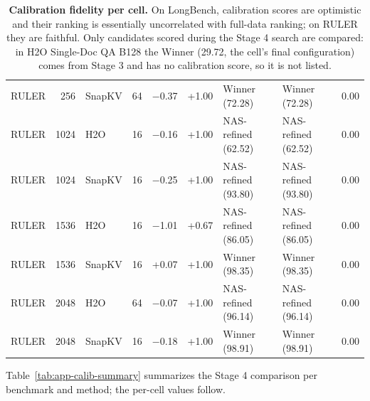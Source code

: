 \begin{table}[t]
\begin{tabular}{@{}l r l r r r l l r@{}}
    RULER & 256 & SnapKV & 64 & $-$0.37 & +1.00 & Winner (72.28) & Winner (72.28) & 0.00 \\
    RULER & 1024 & H2O & 16 & $-$0.16 & +1.00 & NAS-refined (62.52) & NAS-refined (62.52) & 0.00 \\
    RULER & 1024 & SnapKV & 16 & $-$0.25 & +1.00 & NAS-refined (93.80) & NAS-refined (93.80) & 0.00 \\
    RULER & 1536 & H2O & 16 & $-$1.01 & +0.67 & NAS-refined (86.05) & NAS-refined (86.05) & 0.00 \\
    RULER & 1536 & SnapKV & 16 & +0.07 & +1.00 & Winner (98.35) & Winner (98.35) & 0.00 \\
    RULER & 2048 & H2O & 64 & $-$0.07 & +1.00 & NAS-refined (96.14) & NAS-refined (96.14) & 0.00 \\
    RULER & 2048 & SnapKV & 16 & $-$0.18 & +1.00 & Winner (98.91) & Winner (98.91) & 0.00 \\
    \bottomrule
  \end{tabular}
  \caption{\textbf{Calibration fidelity per cell.} On LongBench, calibration scores are optimistic and their ranking is essentially uncorrelated with full-data ranking; on RULER they are faithful. Only candidates scored during the Stage 4 search are compared: in H2O Single-Doc QA B128 the Winner (29.72, the cell's final configuration) comes from Stage 3 and has no calibration score, so it is not listed.}
  \label{tab:app-calib}
\end{table}


Table~\ref{tab:app-calib-summary} summarizes the Stage 4 comparison per benchmark and method; the per-cell values follow.

\begin{table}[!htbp]
  \centering
  \footnotesize\setlength{\tabcolsep}{2.5pt}
  
  \caption{\textbf{Stage 4 calibration (10\% subset) vs.\ full-data scores, summary.} Cells: (task, budget) pairs. Gap: mean calibration minus full-data score. $\tau$: mean Kendall correlation between the two rankings of each cell's re-evaluated configurations. Picks: cells where the calibration-best candidate is also full-data best. Regret: mean full-data points lost by trusting calibration.}
  \label{tab:app-calib-summary}
\end{table}

